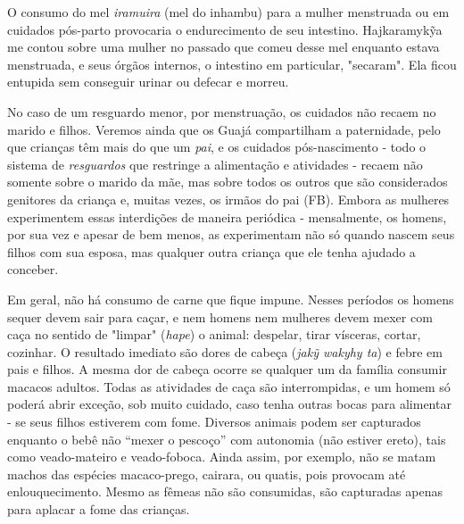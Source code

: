 O consumo do mel \emph{iramuira} (mel do inhambu) para a mulher
menstruada ou em cuidados pós-parto provocaria o endurecimento de seu
intestino. Hajkaramykỹa me contou sobre uma mulher no passado que comeu
desse mel enquanto estava menstruada, e seus órgãos internos, o
intestino em particular, "secaram". Ela ficou entupida sem conseguir
urinar ou defecar e morreu.

No caso de um resguardo menor, por menstruação, os cuidados não recaem
no marido e filhos. Veremos ainda que os Guajá compartilham a
paternidade, pelo que crianças têm mais do que um \emph{pai}, e os
cuidados pós-nascimento - todo o sistema de \emph{resguardos} que
restringe a alimentação e atividades - recaem não somente sobre o marido
da mãe, mas sobre todos os outros que são considerados genitores da
criança e, muitas vezes, os irmãos do pai (FB). Embora as mulheres
experimentem essas interdições de maneira periódica - mensalmente, os
homens, por sua vez e apesar de bem menos, as experimentam não só quando
nascem seus filhos com sua esposa, mas qualquer outra criança que ele
tenha ajudado a conceber.

Em geral, não há consumo de carne que fique impune. Nesses períodos os
homens sequer devem sair para caçar, e nem homens nem mulheres devem
mexer com caça no sentido de "limpar" (\emph{hape}) o animal: despelar,
tirar vísceras, cortar, cozinhar. O resultado imediato são dores de
cabeça (\emph{jakỹ wakyhy ta}) e febre em pais e filhos. A mesma dor de
cabeça ocorre se qualquer um da família consumir macacos adultos. Todas
as atividades de caça são interrompidas, e um homem só poderá abrir
exceção, sob muito cuidado, caso tenha outras bocas para alimentar - se
seus filhos estiverem com fome. Diversos animais podem ser capturados
enquanto o bebê não ``mexer o pescoço'' com autonomia (não estiver
ereto), tais como veado-mateiro e veado-foboca. Ainda assim, por
exemplo, não se matam machos das espécies macaco-prego, cairara, ou
quatis, pois provocam até enlouquecimento. Mesmo as fêmeas não são
consumidas, são capturadas apenas para aplacar a fome das crianças.

